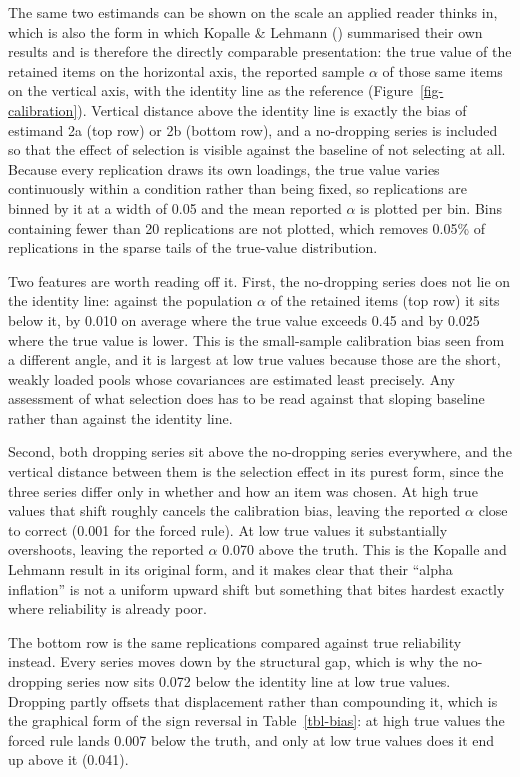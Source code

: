\documentclass[
  nonatbib,
  authoryear,
  preprint]{elsarticle}
\begin{document}
The same two estimands can be shown on the scale an applied reader
thinks in, which is also the form in which Kopalle \& Lehmann
() summarised their own results
and is therefore the directly comparable presentation: the true value of
the retained items on the horizontal axis, the reported sample
\(\alpha\) of those same items on the vertical axis, with the identity
line as the reference (Figure~\ref{fig-calibration}). Vertical distance
above the identity line is exactly the bias of estimand 2a (top row) or
2b (bottom row), and a no-dropping series is included so that the effect
of selection is visible against the baseline of not selecting at all.
Because every replication draws its own loadings, the true value varies
continuously within a condition rather than being fixed, so replications
are binned by it at a width of 0.05 and the mean reported \(\alpha\) is
plotted per bin. Bins containing fewer than 20 replications are not
plotted, which removes 0.05\% of replications in the sparse tails of the
true-value distribution.

Two features are worth reading off it. First, the no-dropping series
does not lie on the identity line: against the population \(\alpha\) of
the retained items (top row) it sits below it, by 0.010 on average where
the true value exceeds 0.45 and by 0.025 where the true value is lower.
This is the small-sample calibration bias seen from a different angle,
and it is largest at low true values because those are the short, weakly
loaded pools whose covariances are estimated least precisely. Any
assessment of what selection does has to be read against that sloping
baseline rather than against the identity line.

Second, both dropping series sit above the no-dropping series
everywhere, and the vertical distance between them is the selection
effect in its purest form, since the three series differ only in whether
and how an item was chosen. At high true values that shift roughly
cancels the calibration bias, leaving the reported \(\alpha\) close to
correct (0.001 for the forced rule). At low true values it substantially
overshoots, leaving the reported \(\alpha\) 0.070 above the truth. This
is the Kopalle and Lehmann result in its original form, and it makes
clear that their ``alpha inflation'' is not a uniform upward shift but
something that bites hardest exactly where reliability is already poor.

The bottom row is the same replications compared against true
reliability instead. Every series moves down by the structural gap,
which is why the no-dropping series now sits 0.072 below the identity
line at low true values. Dropping partly offsets that displacement
rather than compounding it, which is the graphical form of the sign
reversal in Table~\ref{tbl-bias}: at high true values the forced rule
lands 0.007 below the truth, and only at low true values does it end up
above it (0.041).
\end{document}
